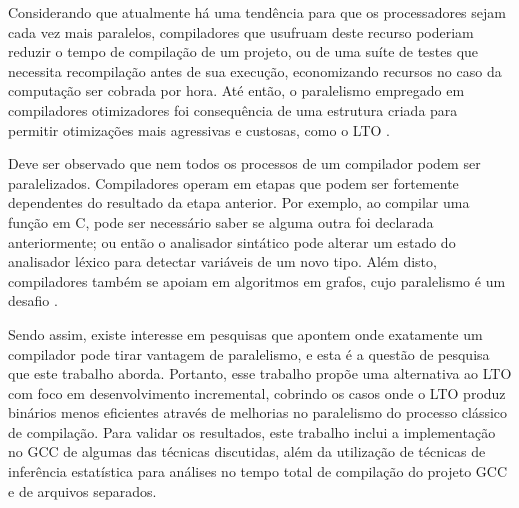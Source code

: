 Considerando que atualmente há uma tendência para que os processadores sejam
cada vez mais paralelos, compiladores que usufruam deste recurso poderiam
reduzir o tempo de compilação de um projeto, ou de uma suíte de testes que
necessita recompilação antes de sua execução, economizando recursos no caso da
computação ser cobrada por hora. Até então, o paralelismo empregado em compiladores
otimizadores foi consequência de uma estrutura criada para permitir otimizações
mais agressivas e custosas, como o LTO \citep{glek2010optimizing}.

Deve ser observado que nem todos os processos de um compilador podem ser
paralelizados. Compiladores operam em etapas que podem ser fortemente
dependentes do resultado da etapa anterior. Por exemplo, ao compilar uma
função em C, pode ser necessário saber se alguma outra foi declarada anteriormente; ou
então o analisador sintático pode alterar um estado do analisador léxico para
detectar variáveis de um novo tipo. Além disto, compiladores também se apoiam em algoritmos
em grafos, cujo paralelismo é um desafio \citep{lumsdaine2007challenges}.

Sendo assim, existe interesse em pesquisas que apontem onde exatamente um compilador
pode tirar vantagem de paralelismo, e esta é a questão de pesquisa que este
trabalho aborda. Portanto, esse trabalho propõe uma alternativa ao LTO com foco
em desenvolvimento incremental, cobrindo os casos onde o LTO produz binários menos
eficientes através de melhorias no paralelismo do processo clássico de compilação.
Para validar os resultados, este trabalho inclui a implementação no GCC de algumas das
técnicas discutidas, além da utilização de técnicas de inferência estatística para
análises no tempo total de compilação do projeto GCC e de arquivos separados.
